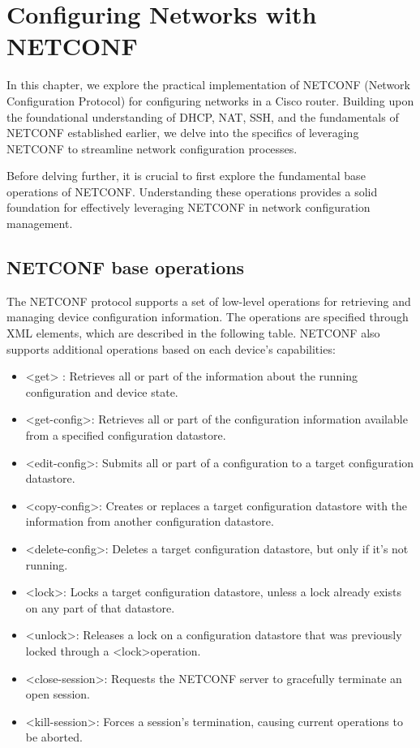 \chapter{Configuring Networks with NETCONF}

In this chapter, we explore the practical implementation of NETCONF (Network Configuration Protocol) for configuring networks in a Cisco router. Building upon the foundational understanding of DHCP, NAT, SSH, and the fundamentals of NETCONF established earlier, we delve into the specifics of leveraging NETCONF to streamline network configuration processes.

Before delving further, it is crucial to first explore the fundamental base operations of NETCONF. Understanding these operations provides a solid foundation for effectively leveraging NETCONF in network configuration management.

\section{NETCONF base operations}

The NETCONF protocol supports a set of low-level operations for retrieving and managing device configuration information. The operations are specified through XML elements, which are described in the following table. NETCONF also supports additional operations based on each device's capabilities:

\begin{itemize}
    \item \textless{get}\textgreater{} : Retrieves all or part of the information about the running configuration and device state.
    \item \textless get-config\textgreater : Retrieves all or part of the configuration information available from a specified configuration datastore.
    \item \textless edit-config\textgreater : Submits all or part of a configuration to a target configuration datastore.
    \item \textless copy-config\textgreater : Creates or replaces a target configuration datastore with the information from another configuration datastore.
    \item \textless delete-config\textgreater : Deletes a target configuration datastore, but only if it's not running.
    \item \textless lock\textgreater : Locks a target configuration datastore, unless a lock already exists on any part of that datastore.
    \item \textless unlock\textgreater : Releases a lock on a configuration datastore that was previously locked through a \textless lock\textgreater operation.
    \item \textless close-session\textgreater : Requests the NETCONF server to gracefully terminate an open session.
    \item \textless kill-session\textgreater : Forces a session's termination, causing current operations to be aborted.
\end{itemize}

